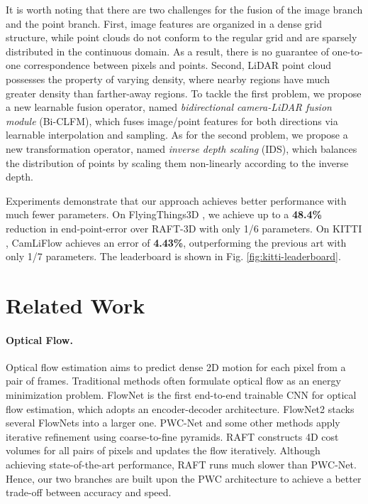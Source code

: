 \documentclass[10pt,twocolumn,letterpaper]{article}
\begin{document}
It is worth noting that there are two challenges for the fusion of the image branch and the point branch. First, image features are organized in a dense grid structure, while point clouds do not conform to the regular grid and are sparsely distributed in the continuous domain. As a result, there is no guarantee of one-to-one correspondence between pixels and points. Second, LiDAR point cloud possesses the property of varying density, where nearby regions have much greater density than farther-away regions. To tackle the first problem, we propose a new learnable fusion operator, named \textit{bidirectional camera-LiDAR fusion module} (Bi-CLFM), which fuses image/point features for both directions via learnable interpolation and sampling. As for the second problem, we propose a new transformation operator, named \textit{inverse depth scaling} (IDS), which balances the distribution of points by scaling them non-linearly according to the inverse depth.

Experiments demonstrate that our approach achieves better performance with much fewer parameters. On FlyingThings3D \cite{mayer2016things3d}, we achieve up to a {\bf48.4\%} reduction in end-point-error over RAFT-3D with only 1/6 parameters. On KITTI \cite{menze2015osf}, CamLiFlow achieves an error of {\bf4.43\%}, outperforming the previous art \cite{yang2021rigidmask} with only 1/7 parameters. The leaderboard is shown in Fig. \ref{fig:kitti-leaderboard}.

\section{Related Work}

\paragraph{Optical Flow.} Optical flow estimation aims to predict dense 2D motion for each pixel from a pair of frames. Traditional methods \cite{horn1981determining, black1996robust, brox2009large, weinzaepfel2013deepflow, brox2004warping, bruhn2005lucas} often formulate optical flow as an energy minimization problem. FlowNet \cite{dosovitskiy2015flownet} is the first end-to-end trainable CNN for optical flow estimation, which adopts an encoder-decoder architecture. FlowNet2 \cite{ilg2017flownet2} stacks several FlowNets into a larger one. PWC-Net \cite{sun2018pwc} and some other methods \cite{ranjan2017spynet, hur2019iterative, hui2018liteflownet, yang2019volumetric} apply iterative refinement using coarse-to-fine pyramids. RAFT \cite{teed2020raft} constructs 4D cost volumes for all pairs of pixels and updates the flow iteratively. Although achieving state-of-the-art performance, RAFT runs much slower than PWC-Net. Hence, our two branches are built upon the PWC architecture to achieve a better trade-off between accuracy and speed.
\end{document}

